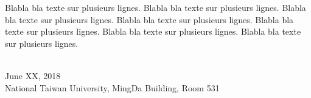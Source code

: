 \begin{acknowledgementsen}

Blabla bla texte sur plusieurs lignes. Blabla bla texte sur plusieurs lignes. Blabla bla texte sur plusieurs lignes. Blabla bla texte sur plusieurs lignes. Blabla bla texte sur plusieurs lignes. Blabla bla texte sur plusieurs lignes. Blabla bla texte sur plusieurs lignes.

\begin{flushright}
\\
June XX, 2018\\
National Taiwan University, MingDa Building, Room 531
\end{flushright}

\end{acknowledgementsen}
